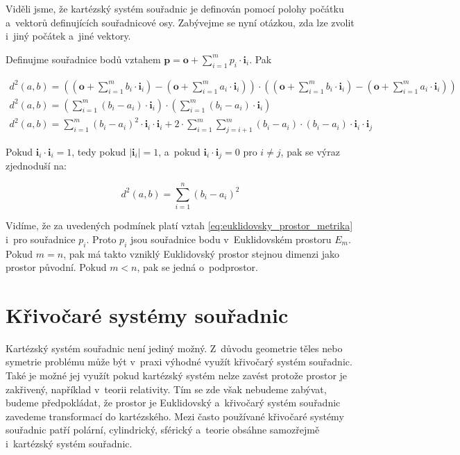 \documentclass{book}
\newcommand{\vect}[1]{\boldsymbol{#1}}
\begin{document}
Viděli jsme, že kartézský systém souřadnic je definován pomocí polohy počátku a~vektorů definujících souřadnicové osy. Zabývejme se nyní otázkou, zda lze zvolit i~jiný počátek a~jiné vektory.

Definujme souřadnice bodů vztahem \(\vect{p} = \vect{o} + \sum_{i=1}^m p_i \cdot \vect{i}_i\). Pak

\begin{equation}
\begin{split}
d^2(a, b) = \left( \left( \vect{o} + \sum_{i=1}^m b_i \cdot \vect{i}_i \right) - \left( \vect{o} + \sum_{i=1}^m a_i \cdot \vect{i}_i \right) \right) \cdot \left(
\left( \vect{o} + \sum_{i=1}^m b_i \cdot \vect{i}_i \right) - \left( \vect{o} + \sum_{i=1}^m a_i \cdot \vect{i}_i \right) \right) \\
d^2(a, b) = \left(\sum_{i=1}^m (b_i - a_i) \cdot \vect{i}_i \right) \cdot \left(\sum_{i=1}^m (b_i - a_i) \cdot \vect{i}_i \right) \\
d^2(a, b) = \sum_{i=1}^m (b_i - a_i)^2 \cdot \vect{i}_i \cdot \vect{i}_i + 2 \cdot \sum_{i=1}^m \sum_{j=i + 1}^m (b_i - a_i) \cdot (b_i - a_i) \cdot \vect{i}_i \cdot \vect{i}_j
\end{split}
\end{equation}

Pokud \(\vect{i}_i \cdot \vect{i}_i = 1\), tedy pokud \(|\vect{i}_i| = 1\), a~pokud \(\vect{i}_i \cdot \vect{i}_j = 0\) pro \(i \neq j\), pak se výraz zjednoduší na:

\begin{equation}
d^2(a, b) = \sum_{i=1}^n (b_i - a_i)^2
\end{equation}

Vidíme, že za uvedených podmínek platí vztah \eqref{eq:euklidovsky_prostor_metrika} i~pro souřadnice \(p_i\). Proto \(p_i\) jsou souřadnice bodu v~Euklidovském prostoru \(E_m\). Pokud \(m = n\), pak má takto vzniklý Euklidovský prostor stejnou dimenzi jako prostor původní. Pokud \(m < n\), pak se jedná o~podprostor.

\section{Křivočaré systémy souřadnic}

Kartézský systém souřadnic není jediný možný. Z~důvodu geometrie těles nebo symetrie problému může být v~praxi výhodné využít křivočarý systém souřadnic. Také je možné jej využít pokud kartézský systém nelze zavést protože prostor je zakřivený, například v~teorii relativity. Tím se zde však nebudeme zabývat, budeme předpokládat, že prostor je Euklidovský a~křivočarý systém souřadnic zavedeme transformací do kartézského. Mezi často používané křivočaré systémy souřadnic patří polární, cylindrický, sférický a~teorie obsáhne samozřejmě i~kartézský systém souřadnic.
\end{document}
